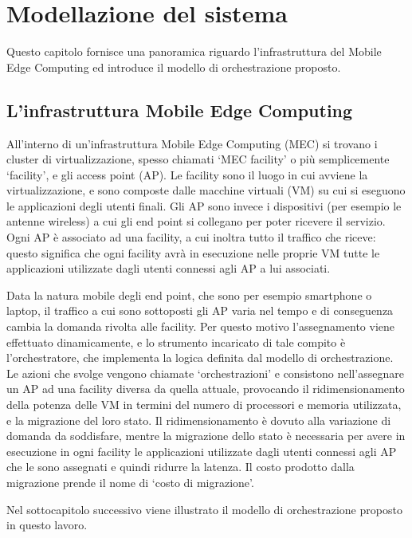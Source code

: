 \chapter{Modellazione del sistema}

Questo capitolo fornisce una panoramica riguardo l'infrastruttura del Mobile Edge Computing ed introduce il modello di orchestrazione proposto.


%
%
\section{L'infrastruttura Mobile Edge Computing}
\label{sec:infrastruttura-mec}

All'interno di un'infrastruttura Mobile Edge Computing (MEC) si trovano i cluster di virtualizzazione, spesso chiamati `MEC facility' o più semplicemente `facility', e gli access point (AP). Le facility sono il luogo in cui avviene la virtualizzazione, e sono composte dalle macchine virtuali (VM) su cui si eseguono le applicazioni degli utenti finali. Gli AP sono invece i dispositivi (per esempio le antenne wireless) a cui gli end point si collegano per poter ricevere il servizio. Ogni AP è associato ad una facility, a cui inoltra tutto il traffico che riceve: questo significa che ogni facility avrà in esecuzione nelle proprie VM tutte le applicazioni utilizzate dagli utenti connessi agli AP a lui associati.

Data la natura mobile degli end point, che sono per esempio smartphone o laptop, il traffico a cui sono sottoposti gli AP varia nel tempo e di conseguenza cambia la domanda rivolta alle facility. Per questo motivo l'assegnamento viene effettuato dinamicamente, e lo strumento incaricato di tale compito è l'orchestratore, che implementa la logica definita dal modello di orchestrazione. Le azioni che svolge vengono chiamate `orchestrazioni' e consistono nell'assegnare un AP ad una facility diversa da quella attuale, provocando il ridimensionamento della potenza delle VM in termini del numero di processori e memoria utilizzata, e la migrazione del loro stato. Il ridimensionamento è dovuto alla variazione di domanda da soddisfare, mentre la migrazione dello stato è necessaria per avere in esecuzione in ogni facility le applicazioni utilizzate dagli utenti connessi agli AP che le sono assegnati e quindi ridurre la latenza. Il costo prodotto dalla migrazione prende il nome di `costo di migrazione'.

Nel sottocapitolo successivo viene illustrato il modello di orchestrazione proposto in questo lavoro.


